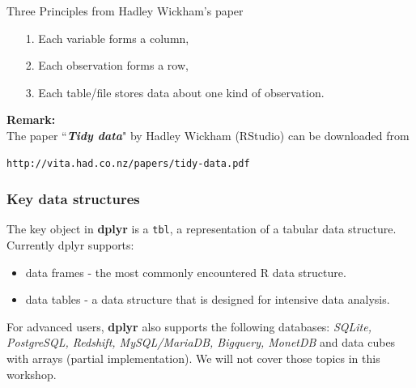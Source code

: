 \documentclass{beamer}
\begin{document}
\begin{frame}[fragile]
\begin{framed}
	\noindent Three Principles from Hadley Wickham's paper
	\begin{itemize}
		\item[1.] Each variable forms a column, 
		\item[2.] Each observation forms a row, 
		\item[3.] Each table/file stores data about one kind of observation.
	\end{itemize}
\end{framed}
\noindent \textbf{Remark:} \\  The paper ``\textit{\textbf{Tidy data}}" by Hadley Wickham (RStudio) can be downloaded from 
\begin{verbatim}
http://vita.had.co.nz/papers/tidy-data.pdf
\end{verbatim}
\end{frame}
\begin{frame}
\frametitle{Key data structures}

The key object in \textbf{dplyr} is a \texttt{tbl}, a representation of a tabular data structure. Currently dplyr supports:

\begin{itemize}
	\item data frames - the  most commonly encountered R data structure. 
	\item data tables - a data structure that is designed for intensive data analysis.
\end{itemize}

\end{frame}
\begin{frame}
\noindent For advanced users, \textbf{dplyr} also supports the following databases: \textit{SQLite, PostgreSQL, Redshift, MySQL/MariaDB, Bigquery, MonetDB} and data cubes with arrays (partial implementation). We will not cover those topics in this workshop.
\end{frame}
\end{document}

